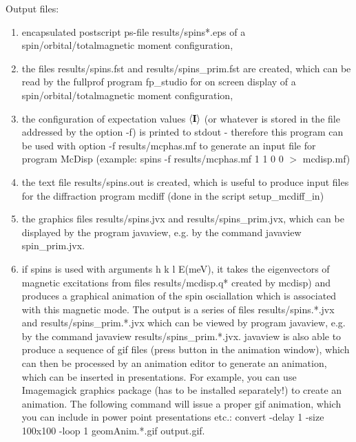 Output files:
\begin{enumerate}
  \item encapsulated postscript ps-file {\prg results/spins*.eps}
                  of a spin/orbital/totalmagnetic moment configuration, 
  \item the files {\prg results/spins.fst} and {\prg results/spins\_prim.fst} are created, 
                which can be read by the fullprof program {\prg fp\_studio}
                for on screen display of a spin/orbital/totalmagnetic moment configuration,
  \item the configuration of expectation values $\langle\mathbf I\rangle$ (or whatever is stored in the file addressed by the option -f)
                 is printed to stdout - therefore this program can be used with option {\prg -f results/mcphas.mf} 
			       to generate an input file
			       for program {\prg  McDisp} (example: {\prg spins -f results/mcphas.mf 1 1 0 0  $>$ mcdisp.mf})  
  \item the text file {\prg results/spins.out} is created, which is useful to produce input files for
              the diffraction program {\prg mcdiff} (done in the script {\prg setup\_mcdiff\_in})
  \item the graphics files {\prg results/spins.jvx} and {\prg results/spins\_prim.jvx}, which can be displayed
         by the program {\prg javaview}, e.g. by the command {\prg javaview spin\_prim.jvx}.
  \item if {\prg spins} is used with arguments {\prg h k l E(meV)}, it takes the eigenvectors of magnetic 
excitations
        from files {\prg results/mcdisp.q*}  created by {\prg mcdisp}) and produces a graphical
        animation of the spin osciallation which is associated with this magnetic mode. The output is a series
        of files {\prg results/spins.*.jvx} and {\prg results/spins\_prim.*.jvx} which can be viewed by program
        {\prg javaview}, e.g. by the command {\prg javaview results/spins\_prim.*.jvx}.  {\prg javaview} 
               is also able to produce a sequence
		of gif files (press button in the animation window), which can then be processed by an animation editor
		to generate an animation, which can be inserted in presentations. For example, you can use
 {\prg  Imagemagick} graphics package (has to be installed separately!)
        to create an animation. The following command will issue a proper gif animation, which you can include in 
           power point        
        presentations etc.: {\prg convert -delay 1 -size 100x100 -loop 1 geomAnim.*.gif output.gif}.
 \end{enumerate}

